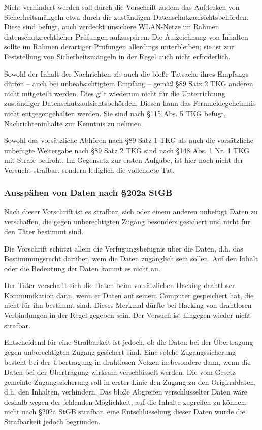 \documentclass[10pt,a4paper]{article}
\begin{document}
Nicht verhindert werden soll durch die Vorschrift zudem das Aufdecken von Sicherheitsmängeln etwa durch die zuständigen Datenschutzaufsichtsbehörden. Diese sind befugt, auch verdeckt unsichere WLAN-Netze im Rahmen datenschutzrechtlicher Prüfungen aufzuspüren. Die Aufzeichnung von Inhalten sollte im Rahmen derartiger Prüfungen allerdings unterbleiben; sie ist zur Feststellung von Sicherheitsmängeln in der Regel auch nicht erforderlich.

Sowohl der Inhalt der Nachrichten als auch die bloße Tatsache ihres Empfangs dürfen – auch bei unbeabsichtigtem Empfang – gemäß §89 Satz 2 TKG anderen nicht mitgeteilt werden. Dies gilt wiederum nicht für die Unterrichtung zuständiger Datenschutzaufsichtsbehörden. Diesen kann das Fernmeldegeheimnis nicht entgegengehalten werden. Sie sind nach §115 Abs. 5 TKG befugt, Nachrichteninhalte zur Kenntnis zu nehmen.

Sowohl das vorsätzliche Abhören nach §89 Satz 1 TKG als auch die vorsätzliche unbefugte Weitergabe nach §89 Satz 2 TKG sind nach §148 Abs. 1 Nr. 1 TKG mit Strafe bedroht. Im Gegensatz zur ersten Aufgabe, ist hier noch nicht der Versucht strafbar, sondern lediglich die vollendete Tat.

\subsubsection*{Ausspähen von Daten nach §202a StGB}
Nach dieser Vorschrift ist es strafbar, sich oder einem anderen unbefugt Daten zu verschaffen, die gegen unberechtigten Zugang besonders gesichert und nicht für den Täter bestimmt sind.

Die Vorschrift schützt allein die Verfügungsbefugnis über die Daten, d.h. das Bestimmungsrecht darüber, wem die Daten zugänglich sein sollen. Auf den Inhalt oder die Bedeutung der Daten kommt es nicht an.

Der Täter verschafft sich die Daten beim vorsätzlichen Hacking drahtloser Kommunikation dann, wenn er Daten auf seinem Computer gespeichert hat, die nicht für ihn bestimmt sind. Dieses Merkmal dürfte bei Hacking von drahtlosen Verbindungen in der Regel gegeben sein. Der Versuch ist hingegen wieder nicht strafbar.

Entscheidend für eine Strafbarkeit ist jedoch, ob die Daten bei der Übertragung gegen unberechtigten Zugang gesichert sind. Eine solche Zugangssicherung besteht bei der Übertragung in drahtlosen Netzen insbesondere dann, wenn die Daten bei der Übertragung wirksam verschlüsselt werden. Die vom Gesetz gemeinte Zugangssicherung soll in erster Linie den Zugang zu den Originaldaten, d.h. den Inhalten, verhindern. Das bloße Abgreifen verschlüsselter Daten wäre deshalb wegen der fehlenden Möglichkeit, auf die Inhalte zugreifen zu können, nicht nach §202a StGB strafbar, eine Entschlüsselung dieser Daten würde die Strafbarkeit jedoch begründen.
\end{document}
